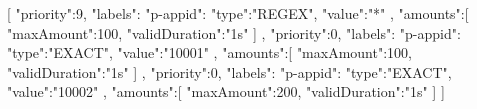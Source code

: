 [{
    "priority":9,
    "labels": {
      "p-appid": {
        "type":"REGEX",
        "value":"*"
      }
    },
    "amounts":[
      {
        "maxAmount":100,
        "validDuration":"1s"
      }
    ]
  },
  {
    "priority":0,
    "labels": {
      "p-appid": {
        "type":"EXACT",
        "value":"10001"
      }
    },
    "amounts":[
      {
        "maxAmount":100,
        "validDuration":"1s"
      }
    ]
  },
  {
    "priority":0,
    "labels": {
      "p-appid": {
        "type":"EXACT",
        "value":"10002"
      }
    },
    "amounts":[
      {
        "maxAmount":200,
        "validDuration":"1s"
      }
    ]
  }
]